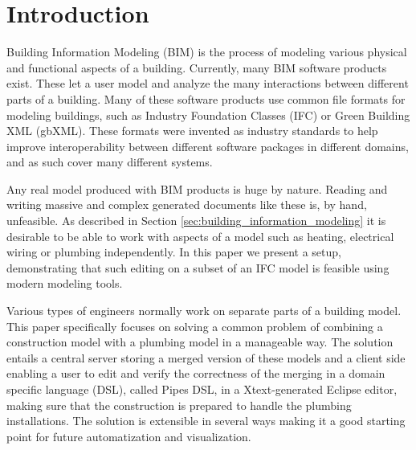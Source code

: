 


\setcounter{page}{1}
\section{Introduction}
Building Information Modeling (BIM) is the process of modeling various physical and functional aspects of a building. Currently, many BIM software products exist. These let a user model and analyze the many interactions between different parts of a building. Many of these software products use common file formats for modeling buildings, such as Industry Foundation Classes (IFC) or Green Building XML (gbXML). These formats were invented as industry standards to help improve interoperability between different software packages in different domains, and as such cover many different systems.

Any real model produced with BIM products is huge by nature. Reading and writing massive and complex generated documents like these is, by hand, unfeasible. As described in Section \ref{sec:building_information_modeling} it is desirable to be able to work with aspects of a model such as heating, electrical wiring or plumbing independently. In this paper we present a setup, demonstrating that such editing on a subset of an IFC model is feasible using modern modeling tools.

Various types of engineers normally work on separate parts of a building model. This paper specifically focuses on solving a common problem of combining a construction model with a plumbing model in a manageable way. The solution entails a central server storing a merged version of these models and a client side enabling a user to edit and verify the correctness of the merging in a domain specific language (DSL), called Pipes DSL, in a Xtext-generated Eclipse editor, making sure that the construction is prepared to handle the plumbing installations. The solution is extensible in several ways making it a good starting point for future automatization and visualization.

